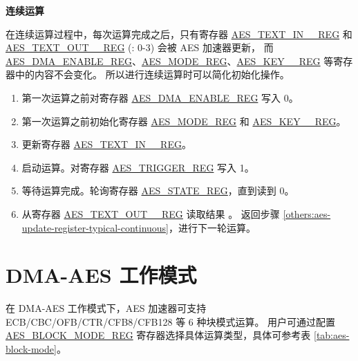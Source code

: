 \documentclass[main\_\_CN.tex]{subfiles}
\begin{document}
\textbf{连续运算}

在连续运算过程中，每次运算完成之后，只有寄存器 \hyperref[regdesc:AESTEXTINnREG]{AES\_TEXT\_IN\_\_REG} 和 \hyperref[regdesc:AESTEXTOUTnREG]{AES\_TEXT\_OUT\_\_REG} (: 0-3) 会被 AES 加速器更新，
而 \hyperref[regdesc:AESDMAENABLEREG]{AES\_DMA\_ENABLE\_REG}、\hyperref[regdesc:AESMODEREG]{AES\_MODE\_REG}、\hyperref[regdesc:AESKEYnREG]{AES\_KEY\_\_REG} 等寄存器中的内容不会变化。
所以进行连续运算时可以简化初始化操作。

\begin{enumerate}
    \item 第一次运算之前对寄存器 \hyperref[regdesc:AESDMAENABLEREG]{AES\_DMA\_ENABLE\_REG} 写入 0。
    \item 第一次运算之前初始化寄存器 \hyperref[regdesc:AESMODEREG]{AES\_MODE\_REG} 和 \hyperref[regdesc:AESKEYnREG]{AES\_KEY\_\_REG}。
    \item 更新寄存器 \hyperref[regdesc:AESTEXTINnREG]{AES\_TEXT\_IN\_\_REG}。 \label{others:aes-update-register-typical-continuous}
    \item 启动运算。对寄存器 \hyperref[regdesc:AESTRIGGERREG]{AES\_TRIGGER\_REG} 写入 1。
    \item 等待运算完成。轮询寄存器 \hyperref[regdesc:AESSTATEREG]{AES\_STATE\_REG}，直到读到 0。
    \item 从寄存器 \hyperref[regdesc:AESTEXTOUTnREG]{AES\_TEXT\_OUT\_\_REG} 读取结果 \label{read result in typical AES continuous calculation}。 返回步骤 \ref{others:aes-update-register-typical-continuous}，进行下一轮运算。
\end{enumerate}


\clearpage

\section{DMA-AES 工作模式}\label{sec:aes-dma-aes}

在 DMA-AES 工作模式下，AES 加速器可支持 ECB/CBC/OFB/CTR/CFB8/CFB128 等 6 种块模式运算。
用户可通过配置 \hyperref[regdesc:AESBLOCKMODEREG]{AES\_BLOCK\_MODE\_REG} 寄存器选择具体运算类型，具体可参考表 \ref{tab:aes-block-mode}。
\end{document}
